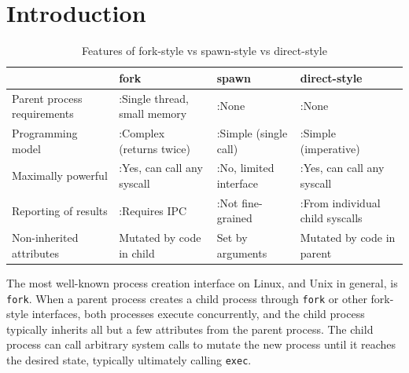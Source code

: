 \documentclass[letterpaper,twocolumn,10pt]{article}
\newcommand{\cmark}{\ding{51}}
\newcommand{\xmark}{\ding{55}}
\newcommand{\tbad}{\xmark:}
\newcommand{\tgood}{\cmark:}
\begin{document}
\section{Introduction}\label{introduction}
\begin{table}
\begin{tabular}{l|l|l|l}
 & fork & spawn & direct-style\\
\hline
Parent process requirements & \tbad Single thread, small memory & \tgood None & \tgood None\\
Programming model & \tbad Complex (returns twice) & \tgood Simple (single call) & \tgood Simple (imperative)\\
Maximally powerful & \tgood Yes, can call any syscall & \tbad No, limited interface & \tgood Yes, can call any syscall\\
Reporting of results & \tbad Requires IPC & \tbad Not fine-grained & \tgood From individual child syscalls\\
Non-inherited attributes & Mutated by code in child & Set by arguments & Mutated by code in parent\\
\end{tabular}
\caption{Features of fork-style vs spawn-style vs direct-style}
\label{tab:styles}
\end{table}

The most well-known process creation interface on Linux, and Unix in general, is \texttt{fork}.
When a parent process creates a child process through \texttt{fork} or other fork-style interfaces,
both processes execute concurrently,
and the child process typically inherits all but a few attributes from the parent process.\cite{manfork}
The child process can call arbitrary system calls
to mutate the new process until it reaches the desired state,
typically ultimately calling \texttt{exec}.
\end{document}
